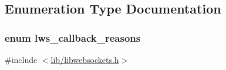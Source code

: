 \subsection{Enumeration Type Documentation}
\subsubsection[{\texorpdfstring{lws\+\_\+callback\+\_\+reasons}{lws\_callback\_reasons}}]{\setlength{\rightskip}{0pt plus 5cm}enum {\bf lws\+\_\+callback\+\_\+reasons}}\hypertarget{group__usercb_gad62860e19975ba4c4af401c3cdb6abf7}{}\label{group__usercb_gad62860e19975ba4c4af401c3cdb6abf7}


{\ttfamily \#include $<$\hyperlink{libwebsockets_8h}{lib/libwebsockets.\+h}$>$}

